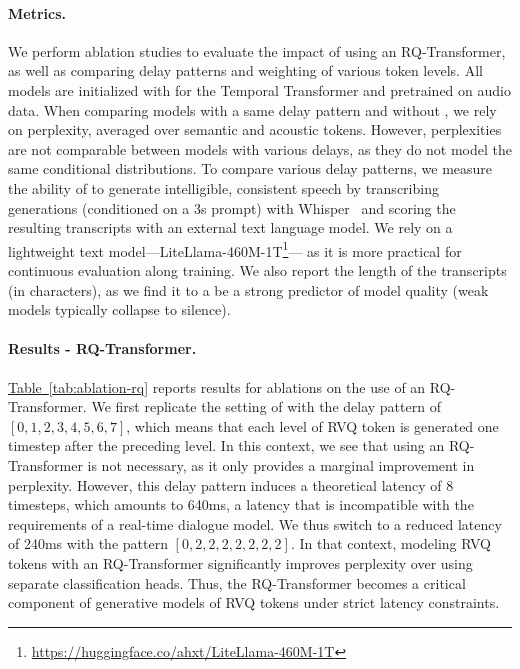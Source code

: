 \paragraph{Metrics.} We perform ablation studies to evaluate the impact of using an RQ-Transformer, as well as comparing delay patterns and weighting of various token levels. All models are initialized with \helium{} for the Temporal Transformer and pretrained on audio data. When comparing models with a same delay pattern and without \interleaving{}, we rely on perplexity, averaged over semantic and acoustic tokens. However, perplexities are not comparable between models with various delays, as they do not model the same conditional distributions. To compare various delay patterns, we measure the ability of \ours{} to generate intelligible, consistent speech by transcribing generations (conditioned on a 3s prompt) with Whisper~\citep{whisper} and scoring the resulting transcripts with an external text language model. We rely on a lightweight text model---LiteLlama-460M-1T\footnote{\url{https://huggingface.co/ahxt/LiteLlama-460M-1T}}--- as it is more practical for continuous evaluation along training. We also report the length of the transcripts (in characters), as we find it to a be a strong predictor of model quality (weak models typically collapse to silence).

\paragraph{Results - RQ-Transformer.} \hyperref[tab:ablation-rq]{Table~\ref{tab:ablation-rq}} reports results for ablations on the use of an RQ-Transformer. We first replicate the setting of \citet{musicgen} with the delay pattern of $[0, 1, 2, 3, 4, 5, 6, 7]$, which means that each level of RVQ token is generated one timestep after the preceding level. In this context, we see that using an RQ-Transformer is not necessary, as it only provides a marginal improvement in perplexity. However, this delay pattern induces a theoretical latency of 8 timesteps, which amounts to 640ms, a latency that is incompatible with the requirements of a real-time dialogue model. We thus switch to a reduced latency of 240ms with the pattern $[0, 2, 2, 2, 2, 2, 2, 2]$. In that context, modeling RVQ tokens with an RQ-Transformer significantly improves perplexity over using separate classification heads. Thus, the RQ-Transformer becomes a critical component of generative models of RVQ tokens under strict latency constraints.

